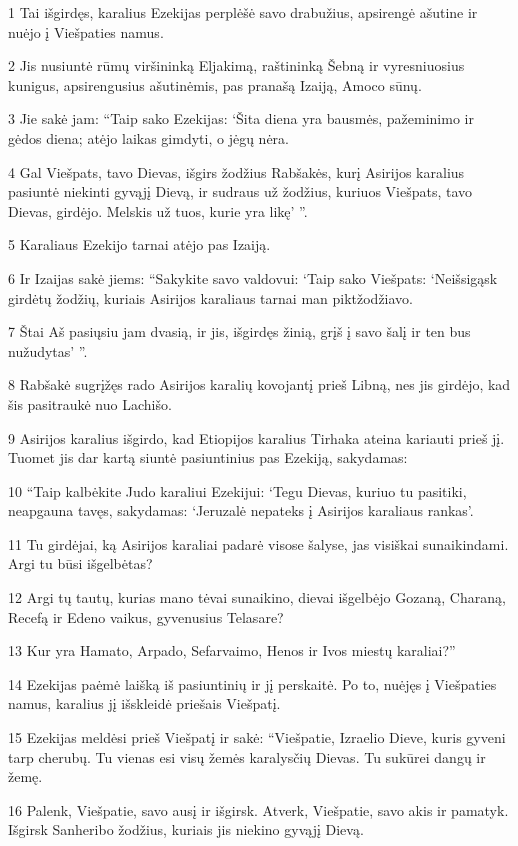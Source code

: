 \par 1 Tai išgirdęs, karalius Ezekijas perplėšė savo drabužius, apsirengė ašutine ir nuėjo į Viešpaties namus. 
\par 2 Jis nusiuntė rūmų viršininką Eljakimą, raštininką Šebną ir vyresniuosius kunigus, apsirengusius ašutinėmis, pas pranašą Izaiją, Amoco sūnų. 
\par 3 Jie sakė jam: “Taip sako Ezekijas: ‘Šita diena yra bausmės, pažeminimo ir gėdos diena; atėjo laikas gimdyti, o jėgų nėra. 
\par 4 Gal Viešpats, tavo Dievas, išgirs žodžius Rabšakės, kurį Asirijos karalius pasiuntė niekinti gyvąjį Dievą, ir sudraus už žodžius, kuriuos Viešpats, tavo Dievas, girdėjo. Melskis už tuos, kurie yra likę’ ”. 
\par 5 Karaliaus Ezekijo tarnai atėjo pas Izaiją. 
\par 6 Ir Izaijas sakė jiems: “Sakykite savo valdovui: ‘Taip sako Viešpats: ‘Neišsigąsk girdėtų žodžių, kuriais Asirijos karaliaus tarnai man piktžodžiavo. 
\par 7 Štai Aš pasiųsiu jam dvasią, ir jis, išgirdęs žinią, grįš į savo šalį ir ten bus nužudytas’ ”. 
\par 8 Rabšakė sugrįžęs rado Asirijos karalių kovojantį prieš Libną, nes jis girdėjo, kad šis pasitraukė nuo Lachišo. 
\par 9 Asirijos karalius išgirdo, kad Etiopijos karalius Tirhaka ateina kariauti prieš jį. Tuomet jis dar kartą siuntė pasiuntinius pas Ezekiją, sakydamas: 
\par 10 “Taip kalbėkite Judo karaliui Ezekijui: ‘Tegu Dievas, kuriuo tu pasitiki, neapgauna tavęs, sakydamas: ‘Jeruzalė nepateks į Asirijos karaliaus rankas’. 
\par 11 Tu girdėjai, ką Asirijos karaliai padarė visose šalyse, jas visiškai sunaikindami. Argi tu būsi išgelbėtas? 
\par 12 Argi tų tautų, kurias mano tėvai sunaikino, dievai išgelbėjo Gozaną, Charaną, Recefą ir Edeno vaikus, gyvenusius Telasare? 
\par 13 Kur yra Hamato, Arpado, Sefarvaimo, Henos ir Ivos miestų karaliai?” 
\par 14 Ezekijas paėmė laišką iš pasiuntinių ir jį perskaitė. Po to, nuėjęs į Viešpaties namus, karalius jį išskleidė priešais Viešpatį. 
\par 15 Ezekijas meldėsi prieš Viešpatį ir sakė: “Viešpatie, Izraelio Dieve, kuris gyveni tarp cherubų. Tu vienas esi visų žemės karalysčių Dievas. Tu sukūrei dangų ir žemę. 
\par 16 Palenk, Viešpatie, savo ausį ir išgirsk. Atverk, Viešpatie, savo akis ir pamatyk. Išgirsk Sanheribo žodžius, kuriais jis niekino gyvąjį Dievą. 
